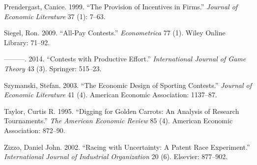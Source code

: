 \documentclass[11pt, titlepage]{article}
\begin{document}
\hypertarget{ref-prendergast1999provision}{}
Prendergast, Canice. 1999. ``The Provision of Incentives in Firms.''
\emph{Journal of Economic Literature} 37 (1): 7--63.

\hypertarget{ref-siegel2009all}{}
Siegel, Ron. 2009. ``All-Pay Contests.'' \emph{Econometrica} 77 (1).
Wiley Online Library: 71--92.

\hypertarget{ref-siegel2014contests}{}
---------. 2014. ``Contests with Productive Effort.''
\emph{International Journal of Game Theory} 43 (3). Springer: 515--23.

\hypertarget{ref-szymanski2003economic}{}
Szymanski, Stefan. 2003. ``The Economic Design of Sporting Contests.''
\emph{Journal of Economic Literature} 41 (4). American Economic
Association: 1137--87.

\hypertarget{ref-taylor1995digging}{}
Taylor, Curtis R. 1995. ``Digging for Golden Carrots: An Analysis of
Research Tournaments.'' \emph{The American Economic Review} 85 (4).
American Economic Association: 872--90.

\hypertarget{ref-zizzo2002racing}{}
Zizzo, Daniel John. 2002. ``Racing with Uncertainty: A Patent Race
Experiment.'' \emph{International Journal of Industrial Organization} 20
(6). Elsevier: 877--902.
\end{document}
